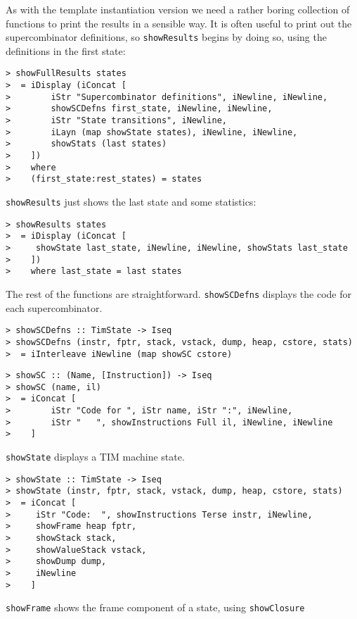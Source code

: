 As with the template instantiation version we need a rather boring
collection of functions to print the results in a sensible way.
It is often useful to print out the supercombinator definitions, so
\mbox{\tt showResults} begins by doing so, using the definitions in the first
state:
\begin{verbatim}
> showFullResults states
>  = iDisplay (iConcat [
>        iStr "Supercombinator definitions", iNewline, iNewline,
>        showSCDefns first_state, iNewline, iNewline,
>        iStr "State transitions", iNewline,
>        iLayn (map showState states), iNewline, iNewline,
>        showStats (last states)
>    ])
>    where
>    (first_state:rest_states) = states
\end{verbatim}
%
\mbox{\tt showResults} just shows the last state and some statistics:
\begin{verbatim}
> showResults states
>  = iDisplay (iConcat [
>     showState last_state, iNewline, iNewline, showStats last_state
>    ])
>    where last_state = last states
\end{verbatim}
%
\par
The rest of the functions are straightforward.  \mbox{\tt showSCDefns} displays
the code for each supercombinator.
\begin{verbatim}
> showSCDefns :: TimState -> Iseq
> showSCDefns (instr, fptr, stack, vstack, dump, heap, cstore, stats)
>  = iInterleave iNewline (map showSC cstore)
\end{verbatim}
%
%
\begin{verbatim}
> showSC :: (Name, [Instruction]) -> Iseq
> showSC (name, il)
>  = iConcat [
>        iStr "Code for ", iStr name, iStr ":", iNewline,
>        iStr "   ", showInstructions Full il, iNewline, iNewline
>    ]
\end{verbatim}
%
%
\mbox{\tt showState} displays a TIM machine state.
\begin{verbatim}
> showState :: TimState -> Iseq
> showState (instr, fptr, stack, vstack, dump, heap, cstore, stats)
>  = iConcat [
>     iStr "Code:  ", showInstructions Terse instr, iNewline,
>     showFrame heap fptr,
>     showStack stack,
>     showValueStack vstack,
>     showDump dump,
>     iNewline
>    ]
\end{verbatim}
%
%
\mbox{\tt showFrame} shows the frame component of a state, using \mbox{\tt showClosure}
